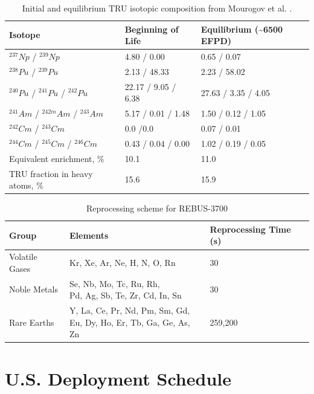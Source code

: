 \begin{table}[h]
	\centering
	\caption{Initial and equilibrium \gls{TRU} isotopic composition from Mourogov et al. \cite{mourogov_potentialities_2006}.}
	\label{tab:rebus_comp}
	\begin{tabularx}{\textwidth}{lll}
		\hline
		Isotope & Beginning of Life & Equilibrium (\textasciitilde 6500 \gls{EFPD}) \\
		\hline
		$^{237} Np$ / $^{239} Np$ &  4.80 / 0.00 & 0.65 / 0.07 \\
		$^{238} Pu$ / $^{239} Pu$ & 2.13 / 48.33  & 2.23 / 58.02  \\
		$^{240} Pu$ / $^{241} Pu$ / $^{242} Pu$ & 22.17 / 9.05 / 6.38 & 27.63 / 3.35 / 4.05 \\
		$^{241} Am$ / $^{242m} Am$ / $^{243} Am$ &5.17 / 0.01 / 1.48 & 1.50 / 0.12 / 1.05 \\
		$^{242} Cm$ / $^{243} Cm$  & 0.0 /0.0  & 0.07 / 0.01  \\
		$^{244} Cm$ / $^{245} Cm$ / $^{246} Cm$ & 0.43 / 0.04 / 0.00 & 1.02 / 0.19 / 0.05 \\
		Equivalent enrichment, \% & 10.1 & 11.0 \\
		\gls{TRU} fraction in heavy atoms, \% & 15.6 & 15.9 \\
		\hline
	\end{tabularx}
\end{table}


\begin{table}[h]
	\centering
	\caption{Reprocessing scheme for REBUS-3700}
	\label{tab:rebus_reproc}
	\begin{tabular}{lll}
		\hline
		Group & Elements & Reprocessing Time (s) \\
		\hline
		Volatile Gases & Kr, Xe, Ar, Ne, H, N, O, Rn & 30 \\
		Noble Metals & \shortstack{Se, Nb, Mo, Tc, Ru, Rh,\\ Pd, Ag, Sb, Te, Zr, Cd, In, Sn} & 30 \\
		Rare Earths & \shortstack{Y, La, Ce, Pr, Nd, Pm, Sm, Gd, \\ Eu, Dy, Ho, Er, Tb, Ga, Ge, As, Zn} & 259,200 \\
		\hline
	\end{tabular}
\end{table}



\section{U.S. Deployment Schedule}

